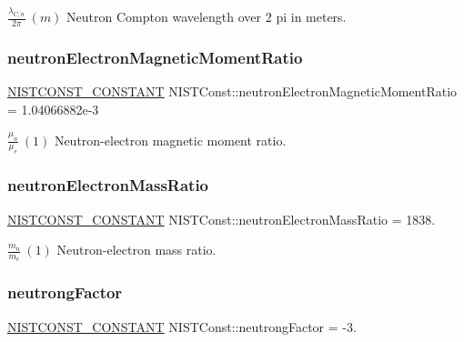 $\frac{\lambda_{C,n}}{2\pi} \ (m)$ Neutron Compton wavelength over 2 pi in meters. \mbox{\label{group___n_i_s_t_const-_neutron_ga18e39275d61e889aada6523c0faedb28}} 
\subsubsection{\texorpdfstring{neutron\+Electron\+Magnetic\+Moment\+Ratio}{neutronElectronMagneticMomentRatio}}
{\footnotesize\ttfamily \mbox{\hyperlink{_n_i_s_t_const_8hpp_a2b0fc1d7452373f816175dd86ce26729}{N\+I\+S\+T\+C\+O\+N\+S\+T\+\_\+\+C\+O\+N\+S\+T\+A\+NT}} N\+I\+S\+T\+Const\+::neutron\+Electron\+Magnetic\+Moment\+Ratio = 1.\+04066882e-\/3}

$\frac{\mu_n}{\mu_e} \ (1)$ Neutron-\/electron magnetic moment ratio. \mbox{\label{group___n_i_s_t_const-_neutron_gaed8ff3598a8de7256064056501b72e97}} 
\subsubsection{\texorpdfstring{neutron\+Electron\+Mass\+Ratio}{neutronElectronMassRatio}}
{\footnotesize\ttfamily \mbox{\hyperlink{_n_i_s_t_const_8hpp_a2b0fc1d7452373f816175dd86ce26729}{N\+I\+S\+T\+C\+O\+N\+S\+T\+\_\+\+C\+O\+N\+S\+T\+A\+NT}} N\+I\+S\+T\+Const\+::neutron\+Electron\+Mass\+Ratio = 1838.}

$\frac{m_n}{m_e} \ (1)$ Neutron-\/electron mass ratio. \mbox{\label{group___n_i_s_t_const-_neutron_ga6391993dd3564c84df74dd3e9e245f4b}} 
\subsubsection{\texorpdfstring{neutrong\+Factor}{neutrongFactor}}
{\footnotesize\ttfamily \mbox{\hyperlink{_n_i_s_t_const_8hpp_a2b0fc1d7452373f816175dd86ce26729}{N\+I\+S\+T\+C\+O\+N\+S\+T\+\_\+\+C\+O\+N\+S\+T\+A\+NT}} N\+I\+S\+T\+Const\+::neutrong\+Factor = -\/3.}

